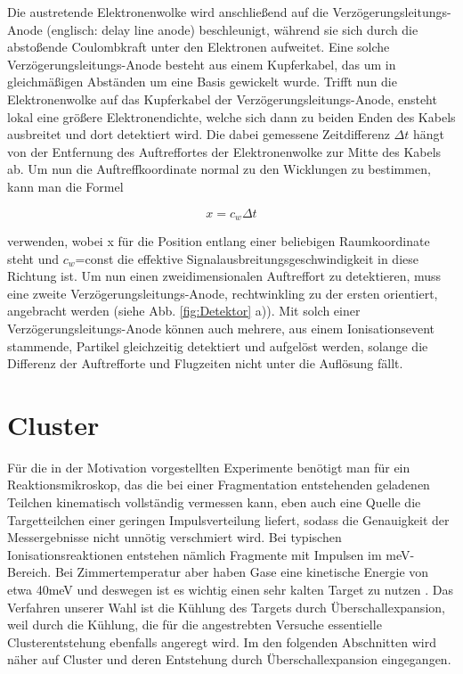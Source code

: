 Die austretende Elektronenwolke wird anschließend auf die Verzögerungsleitungs-Anode (englisch: delay line anode) beschleunigt, während sie sich durch die abstoßende Coulombkraft unter den Elektronen aufweitet. Eine solche Verzögerungsleitungs-Anode besteht aus einem Kupferkabel, das um in gleichmäßigen Abständen um eine Basis gewickelt wurde. Trifft nun die Elektronenwolke auf das Kupferkabel der Verzögerungsleitungs-Anode, ensteht lokal eine größere Elektronendichte, welche sich dann zu beiden Enden des Kabels ausbreitet und dort detektiert wird. Die dabei gemessene Zeitdifferenz $\Delta t$ hängt von der Entfernung des Auftreffortes der Elektronenwolke zur Mitte des Kabels ab. Um nun die Auftreffkoordinate normal zu den Wicklungen zu bestimmen, kann man die Formel

\begin{equation}
x = c_w \Delta t
\end{equation}

verwenden, wobei x für die Position entlang einer beliebigen Raumkoordinate steht und $c_w$=const die effektive Signalausbreitungsgeschwindigkeit in diese Richtung ist. Um nun einen zweidimensionalen Auftreffort zu detektieren, muss eine zweite Verzögerungsleitungs-Anode, rechtwinkling zu der ersten orientiert, angebracht werden (siehe Abb. \ref{fig:Detektor} a)). Mit solch einer Verzögerungsleitungs-Anode können auch mehrere, aus einem Ionisationsevent stammende, Partikel gleichzeitig detektiert und aufgelöst werden, solange die Differenz der Auftrefforte und Flugzeiten nicht unter die Auflösung fällt.


\newpage
\section{Cluster} \label{sec:Cluster}

Für die in der Motivation vorgestellten Experimente benötigt man für ein Reaktionsmikroskop, das die bei einer Fragmentation entstehenden geladenen Teilchen kinematisch vollständig vermessen kann, eben auch eine Quelle die Targetteilchen einer geringen Impulsverteilung liefert, sodass die Genauigkeit der Messergebnisse nicht unnötig verschmiert wird. Bei typischen Ionisationsreaktionen entstehen nämlich Fragmente mit Impulsen im meV-Bereich. Bei Zimmertemperatur aber haben Gase eine kinetische Energie von etwa 40meV und deswegen ist es wichtig einen sehr kalten Target zu nutzen \cite{kurka07}. Das Verfahren unserer Wahl ist die Kühlung des Targets durch Überschallexpansion, weil durch die Kühlung, die für die angestrebten Versuche essentielle Clusterentstehung ebenfalls angeregt wird. Im den folgenden Abschnitten wird näher auf Cluster und deren Entstehung durch Überschallexpansion eingegangen.


